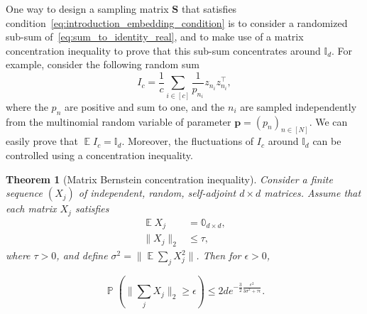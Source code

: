 \documentclass[twoside,11pt]{book}
\newtheorem{theorem}{Theorem}
\numberwithin{theorem}{chapter}
\numberwithin{definition}{chapter}
\numberwithin{proposition}{chapter}
\numberwithin{corollary}{chapter}
\numberwithin{example}{chapter}
\numberwithin{lemma}{chapter}
\numberwithin{assumption}{chapter}
\numberwithin{equation}{chapter}
\numberwithin{figure}{chapter}
\DeclareMathOperator{\Tran}{\intercal}
\DeclareMathOperator{\EX}{\mathbb{E}}
\DeclareMathOperator{\Prb}{\mathbb{P}}
\begin{document}
One way to design a sampling matrix $\bm{S}$ that satisfies condition~\eqref{eq:introduction_embedding_condition} is to consider a randomized sub-sum of~\eqref{eq:sum_to_identity_real}, and to make use of a matrix concentration inequality to prove that this sub-sum concentrates around $\mathbb{I}_{d}$. For example, consider the following random sum
\begin{equation}\label{eq:introduction_random_subsample}
I_{c} = \frac{1}{c}\sum\limits_{i \in [c]} \frac{1}{p_{n_{i}}}z_{{n_{i}}}z_{{n_{i}}}^{\Tran},
\end{equation}
where the $p_n$ are positive and sum to one, and the $n_{i}$ are sampled independently from the multinomial random variable of parameter $\bm{p} = (p_{n})_{n \in [N]}$. We can easily prove  that $\EX I_{c} = \mathbb{I}_{d}$. Moreover, the fluctuations of $I_{c}$ around $\mathbb{I}_{d}$ can be controlled using a concentration inequality.
\begin{theorem}[Matrix Bernstein concentration inequality] \parencite{Tro15}\label{thm:matrix_bernstein}
Consider a finite sequence $(X_{j})$ of independent, random, self-adjoint $d\times d$ matrices. Assume that each matrix $X_{j}$
satisfies 
\begin{align}
 \EX X_{j} &= \mathbb{0}_{d \times d},\\
 \|X_{j}\|_{2} &\leq \tau,
\end{align}
where $\tau >0$, and define $\sigma^{2} = \|\EX \sum\limits_{j} X_{j}^{2}\|$.
 Then for $\epsilon >0$, 

\begin{equation}
\Prb \left( \big\|\sum\limits_{j} X_{j} \big\|_{2} \geq \epsilon \right) \leq 2 d e^{-\frac{3}{2} \frac{\epsilon^{2}}{3\sigma^{2} + \tau \epsilon}}.
\end{equation}
\end{theorem}
\end{document}
